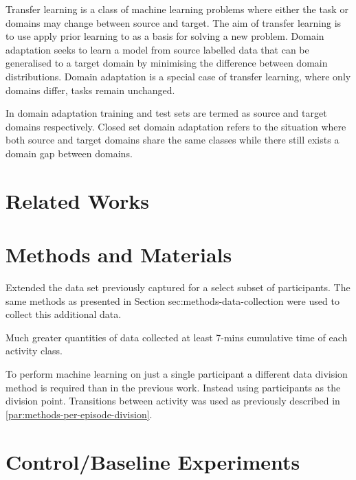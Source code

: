 Transfer learning is a class of machine learning problems where either the task or domains may change between source and target. The aim of transfer learning is to use apply prior learning to as a basis for solving a new problem. Domain adaptation seeks to learn a model from source labelled data that can be generalised to a target domain by minimising the difference between domain distributions. Domain adaptation is a special case of transfer learning, where only domains differ, tasks remain unchanged.\cite{Farahani2021}

In domain adaptation training and test sets are termed as source and target domains respectively. Closed set domain adaptation refers to the situation where both source and target domains share the same classes while there still exists a domain gap between domains.\cite{Farahani2021}

\section{Related Works}


\cite{Cruciani2020}

\cite{Fu2021}



\section{Methods and Materials}
Extended the data set previously captured for a select subset of participants. The same methods as presented in Section {sec:methods-data-collection} were used to collect this additional data.

Much greater quantities of data collected at least 7-mins cumulative time of each activity class. 

To perform machine learning on just a single participant a different data division method is required than in the previous work. Instead using participants as the division point. Transitions between activity was used as previously described in \ref{par:methods-per-episode-division}.



\section{Control/Baseline Experiments}

